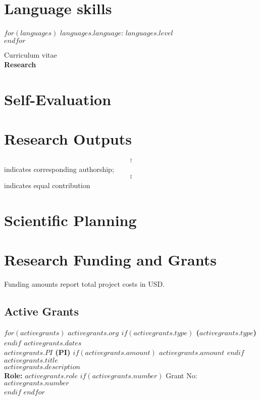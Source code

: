 \documentclass[martgin, line, 11pt]{article}
\begin{document}
\section*{Language skills}
\noindent
$for(languages)$
 $languages.language$: $languages.level$\\
$endfor$

\newpage

\begin{flushright}
  {\large Curriculum vitae}\\
  {\large \textbf{Research}}
\end{flushright}

\section*{Self-Evaluation}


\section*{Research Outputs} 
\begin{footnotesize}
    $$^\dagger$$ indicates corresponding authorship;
    $$^\ddagger$$ indicates equal contribution
\end{footnotesize}


\section*{Scientific Planning}


\section*{Research Funding and Grants}
Funding amounts report total project costs in USD.
\subsection*{Active Grants}

$for(activegrants)$
\textbf{$activegrants.org$
$if(activegrants.type)$
 ($activegrants.type$)
$endif$
\hfill $activegrants.dates$\\
$activegrants.PI$ (PI)
\hfill
$if(activegrants.amount)$
$activegrants.amount$
$endif$\\
$activegrants.title$}\\
$activegrants.description$\\
\textbf{Role:} $activegrants.role$
\hfill
$if(activegrants.number)$ Grant No: $activegrants.number$\\$endif$
$endfor$
\end{document}
